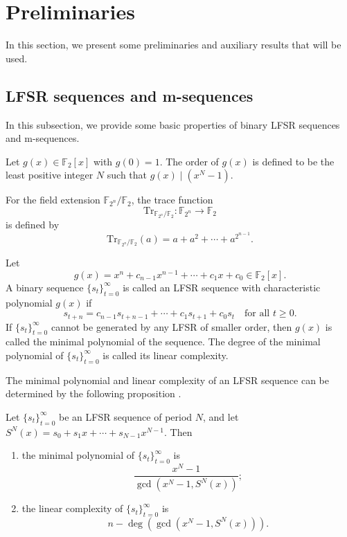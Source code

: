 \documentclass[hidelinks,onefignum,onetabnum]{siamart251216}
\theoremstyle{definition}
\theoremstyle{remark}
\providecommand{\Tr}{{\mathrm{Tr}}}
\begin{document}
\section{Preliminaries}\label{sec-preliminary}
In this section, we present some preliminaries and auxiliary results that will be used.

\subsection{LFSR sequences and m-sequences}

In this subsection, we provide some basic properties of binary LFSR sequences and m-sequences.

\begin{definition}
	Let $g(x)\in \mathbb F_2[x]$ with $g(0)=1$. The order of $g(x)$ is defined to be the least positive integer $N$ such that $g(x)\mid (x^N-1)$.
\end{definition}

\begin{definition}
	For the field extension $\mathbb F_{2^n}/\mathbb F_2$, the trace function
	\[
	\Tr_{\mathbb F_{2^n}/\mathbb F_2}:\mathbb F_{2^n}\to \mathbb F_2
	\]
	is defined by
	\[
	\Tr_{\mathbb F_{2^n}/\mathbb F_2}(a)=a+a^2+\cdots+a^{2^{n-1}}.
	\]

\end{definition}

\begin{definition}
	Let
	\[
	g(x)=x^n+c_{n-1}x^{n-1}+\cdots+c_1x+c_0\in \mathbb F_2[x].
	\]
	A binary sequence $\{s_t\}_{t=0}^\infty$ is called an LFSR sequence with characteristic polynomial $g(x)$ if
	\[
	s_{t+n}=c_{n-1}s_{t+n-1}+\cdots+c_1s_{t+1}+c_0s_t
	\quad\text{for all } t\ge 0.
	\]
	 If $\{s_t\}_{t=0}^\infty$ cannot be generated by any LFSR of smaller order, then $g(x)$ is called the minimal polynomial of the sequence. The degree of the minimal polynomial of $\{s_t\}_{t=0}^{\infty}$ is called its linear complexity.
\end{definition}
The minimal polynomial and linear complexity of an LFSR sequence can be determined by the following proposition \cite{Lidl 1997}.

\begin{proposition}
Let $\{s_t\}_{t=0}^\infty$ be an LFSR sequence of period $N$, and let $S^{N}(x)=s_0+s_1x+\cdots+s_{N-1}x^{N-1}$. Then 
	\begin{enumerate}
	\item  the minimal polynomial of $\{s_t\}_{t=0}^\infty$ is 
	$$\frac{x^N-1}{\gcd(x^N-1,S^{N}(x))};$$
	
	\item the linear complexity of $\{s_t\}_{t=0}^\infty$ is  $$n-\deg(\gcd(x^N-1,S^{N}(x))).$$
\end{enumerate}
\end{proposition}
\end{document}
